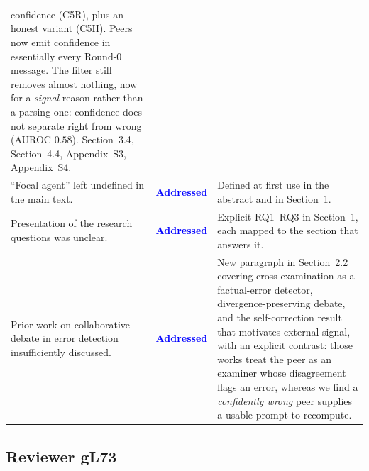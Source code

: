 \documentclass[11pt]{article}
\newcommand{\done}{\textcolor{blue}{\textbf{Addressed}}}
\begin{document}
\begin{longtable}{@{}p{}p{}p{}@{}}
  confidence (C5R), plus an honest variant (C5H). Peers now emit confidence in
  essentially every Round-0 message. The filter still removes almost nothing,
  now for a \emph{signal} reason rather than a parsing one: confidence does not
  separate right from wrong (AUROC $0.58$). Section~3.4, Section~4.4,
  Appendix~S3, Appendix~S4. \\
\addlinespace
``Focal agent'' left undefined in the main text.
& \done
& Defined at first use in the abstract and in Section~1. \\
\addlinespace
Presentation of the research questions was unclear.
& \done
& Explicit RQ1--RQ3 in Section~1, each mapped to the section that answers it. \\
\addlinespace
Prior work on collaborative debate in error detection insufficiently
discussed.
& \done
& New paragraph in Section~2.2 covering cross-examination as a factual-error
  detector, divergence-preserving debate, and the self-correction result that
  motivates external signal, with an explicit contrast: those works treat the
  peer as an examiner whose disagreement flags an error, whereas we find a
  \emph{confidently wrong} peer supplies a usable prompt to recompute. \\
\bottomrule
\end{longtable}

\subsection*{Reviewer gL73}
\end{document}
